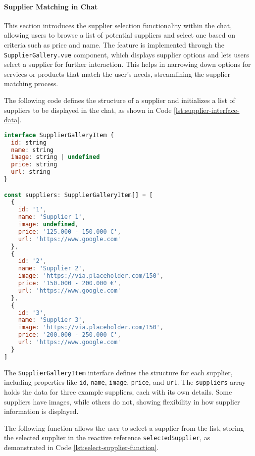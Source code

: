 \paragraph{Supplier Matching in Chat}

This section introduces the supplier selection functionality within the chat, allowing users to browse a list of
potential suppliers and select one based on criteria such as price and name. The feature is implemented through the
\texttt{SupplierGallery.vue} component, which displays supplier options and lets users select a supplier for further
interaction. This helps in narrowing down options for services or products that match the user’s needs, streamlining
the supplier matching process.

The following code defines the structure of a supplier and initializes a list of suppliers to be displayed in the chat,
as shown in Code \ref{lst:supplier-interface-data}.

\begin{lstlisting}[language=JavaScript, caption={Defining the Supplier Interface and Data
    (\texttt{SupplierGallery.vue})}, firstnumber=4,label={lst:supplier-interface-data}]
interface SupplierGalleryItem {
  id: string
  name: string
  image: string | undefined
  price: string
  url: string
}

const suppliers: SupplierGalleryItem[] = [
  {
    id: '1',
    name: 'Supplier 1',
    image: undefined,
    price: '125.000 - 150.000 €',
    url: 'https://www.google.com'
  },
  {
    id: '2',
    name: 'Supplier 2',
    image: 'https://via.placeholder.com/150',
    price: '150.000 - 200.000 €',
    url: 'https://www.google.com'
  },
  {
    id: '3',
    name: 'Supplier 3',
    image: 'https://via.placeholder.com/150',
    price: '200.000 - 250.000 €',
    url: 'https://www.google.com'
  }
]
\end{lstlisting}

The \texttt{SupplierGalleryItem} interface defines the structure for each supplier, including properties like
\texttt{id}, \texttt{name}, \texttt{image}, \texttt{price}, and \texttt{url}. The \texttt{suppliers} array holds the
data for three example suppliers, each with its own details. Some suppliers have images, while others do not, showing
flexibility in how supplier information is displayed.

The following function allows the user to select a supplier from the list, storing the selected supplier in the reactive
reference \texttt{selectedSupplier}, as demonstrated in Code \ref{lst:select-supplier-function}.

